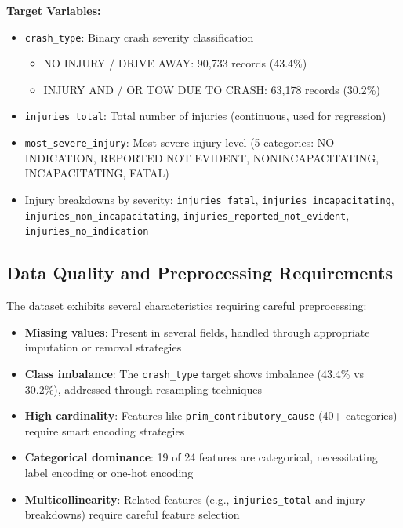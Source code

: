 \documentclass[12pt,man]{apa7}
\begin{document}
\textbf{Target Variables:}
\begin{itemize}
    \item \texttt{crash\_type}: Binary crash severity classification
    \begin{itemize}
        \item NO INJURY / DRIVE AWAY: 90,733 records (43.4\%)
        \item INJURY AND / OR TOW DUE TO CRASH: 63,178 records (30.2\%)
    \end{itemize}
    \item \texttt{injuries\_total}: Total number of injuries (continuous, used for regression)
    \item \texttt{most\_severe\_injury}: Most severe injury level (5 categories: NO INDICATION, REPORTED NOT EVIDENT, NONINCAPACITATING, INCAPACITATING, FATAL)
    \item Injury breakdowns by severity: \texttt{injuries\_fatal}, \texttt{injuries\_incapacitating}, \texttt{injuries\_non\_incapacitating}, \texttt{injuries\_reported\_not\_evident}, \texttt{injuries\_no\_indication}
\end{itemize}

\subsection{Data Quality and Preprocessing Requirements}

The dataset exhibits several characteristics requiring careful preprocessing:

\begin{itemize}
    \item \textbf{Missing values}: Present in several fields, handled through appropriate imputation or removal strategies
    \item \textbf{Class imbalance}: The \texttt{crash\_type} target shows imbalance (43.4\% vs 30.2\%), addressed through resampling techniques
    \item \textbf{High cardinality}: Features like \texttt{prim\_contributory\_cause} (40+ categories) require smart encoding strategies
    \item \textbf{Categorical dominance}: 19 of 24 features are categorical, necessitating label encoding or one-hot encoding
    \item \textbf{Multicollinearity}: Related features (e.g., \texttt{injuries\_total} and injury breakdowns) require careful feature selection
\end{itemize}
\end{document}
